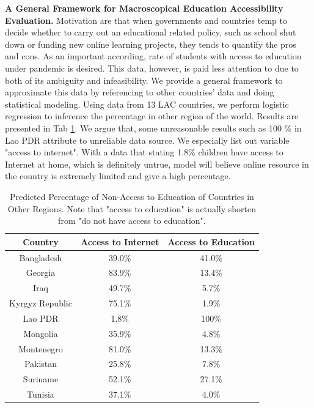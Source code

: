 \documentclass{article}
\begin{document}
     \textbf{A General Framework for Macroscopical Education Accessibility Evaluation. } Motivation are that when governments and countries temp to decide whether to carry out an educational related policy, such as school shut down or funding new online learning projects, they tends to quantify the pros and cons. As an important according, rate of students with access to education under pandemic is desired. This data, however, is paid less attention to due to both of its ambiguity and infeasibility. We provide a general framework to approximate this data by referencing to other countries' data and doing statistical modeling. Using data from 13 LAC countries, we perform logistic regression to inference the percentage in other region of the world. Results are presented in Tab \ref{Tab:4}. We argue that, some unreasonable results such as 100 \% in Lao PDR attribute to unreliable data source. We especially list out variable "access to internet". With a data that stating 1.8\% children have access to Internet at home, which is definitely untrue, model will believe online resource in the country is extremely limited and give a high percentage.








\begin{table}[]
\centering
\caption{Predicted Percentage of Non-Access to Education of Countries in Other Regions. Note that "access to education" is actually shorten from "do not have access to education". }
\begin{tabular}{ccc}
\hline
Country                & Access to Internet & Access to Education \\ \hline
Bangladesh      & 39.0\%             & 41.0\%              \\
Georgia         & 83.9\%             & 13.4\%              \\
Iraq            & 49.7\%             & 5.7\%               \\
Kyrgyz Republic & 75.1\%             & 1.9\%               \\
Lao PDR         &  {\color{red}1.8\%}               & {\color{red}100\% }              \\
Mongolia        & 35.9\%             & 4.8\%               \\
Montenegro      & 81.0\%             & 13.3\%              \\
Pakistan        & 25.8\%             & 7.8\%               \\
Suriname        & 52.1\%             & 27.1\%              \\
Tunisia         & 37.1\%             & 4.0\%               \\ \hline
\end{tabular}
\label{Tab:4}
\end{table}
\end{document}
